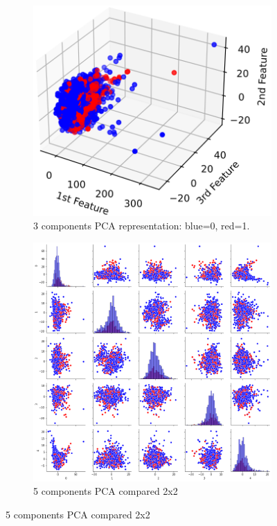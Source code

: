 \documentclass[letterpaper,11pt]{article}
\begin{document}
\begin{figure}[htb]
    \centering
    \begin{subfigure}[b]{0.4\textwidth}
        \centering
        \includegraphics[width=\textwidth]{Images/3DvisuOf3MainFeatures.png}
        \caption{3 components PCA representation: blue=0, red=1.}
        \label{fig:3DPCA}
    \end{subfigure}
    \hfill
    \begin{subfigure}[b]{0.62\textwidth}
        \centering
        \includegraphics[width=\textwidth]{Images/plot5maincomponents.png}
        \caption{5 components PCA compared 2x2}
        \label{fig:5DPCA}
    \end{subfigure}
\end{figure}
\end{document}
